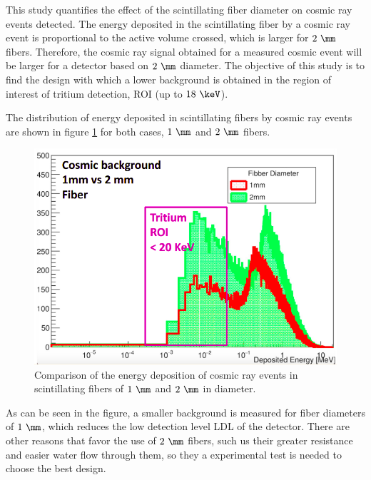 This study quantifies the effect of the scintillating fiber diameter on cosmic ray events detected. The energy deposited in the scintillating fiber by a cosmic ray event is proportional to the active volume crossed, which is larger for $2~\mm$ fibers. Therefore, the cosmic ray signal obtained for a measured cosmic event will be larger for a detector based on $2~\mm$ diameter. The objective of this study is to find the design with which a lower background is obtained in the region of interest of tritium detection, ROI (up to $18~\keV$).

The distribution of energy deposited in scintillating fibers by cosmic ray events are shown in figure \ref{fig:DiameterComparison} for both cases, $1~\mm$ and $2~\mm$ fibers.

\begin{figure}[hbtp]
\centering
\includegraphics[scale=0.4]{Figures/8SimulationsResults/81TRITIUMDesign/814Diameter/ComparisonDiameter.png}
\caption{Comparison of the energy deposition of cosmic ray events in scintillating fibers of $1~\mm$ and $2~\mm$ in diameter.\label{fig:DiameterComparison}}
\end{figure}

As can be seen in the figure, a smaller background is measured for fiber diameters of $1~\mm$, which reduces the low detection level LDL of the detector. There are other reasons that favor the use of $2~\mm$ fibers, such us their greater resistance and easier water flow through them, so they a experimental test is needed to choose the best design.


